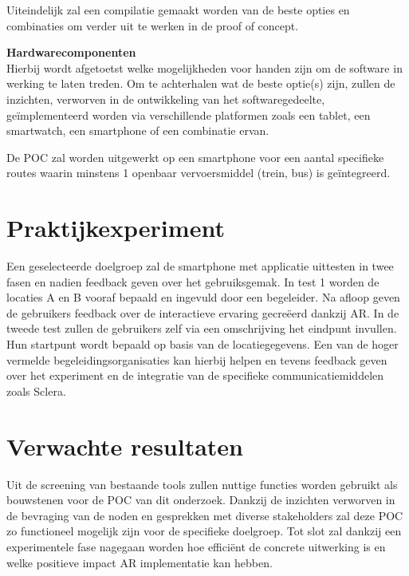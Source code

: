 \documentclass{hogent-article}
\begin{document}
    Uiteindelijk zal een compilatie gemaakt worden van de beste opties en combinaties om verder uit te werken in de proof of concept.
    
    \textbf{Hardwarecomponenten} \\
    
    Hierbij wordt afgetoetst welke mogelijkheden voor handen zijn om de software in werking te laten treden. Om te achterhalen wat de beste optie(s) zijn, zullen de inzichten, verworven in de ontwikkeling van het softwaregedeelte, geïmplementeerd worden via verschillende platformen zoals een tablet, een smartwatch, een smartphone of een combinatie ervan.
    
    De POC zal worden uitgewerkt op een smartphone voor een aantal specifieke routes waarin minstens 1 openbaar vervoersmiddel (trein, bus) is geïntegreerd.
    
    \section{Praktijkexperiment}
    \label{sec:praktijkexperiment}
    Een geselecteerde doelgroep zal de smartphone met applicatie uittesten in twee fasen en nadien feedback geven over het gebruiksgemak. In test 1 worden de locaties A en B vooraf bepaald en ingevuld door een begeleider. Na afloop geven de gebruikers feedback over de interactieve ervaring gecreëerd dankzij AR. In de tweede test zullen de gebruikers zelf via een omschrijving het eindpunt invullen. Hun startpunt wordt bepaald op basis van de locatiegegevens. Een van de hoger vermelde begeleidingsorganisaties kan hierbij helpen en tevens feedback geven over het experiment en de integratie van de specifieke communicatiemiddelen zoals Sclera.



    \section{Verwachte resultaten}%
    \label{sec:verwachte-resultaten}
    
    Uit de screening van bestaande tools zullen nuttige functies worden gebruikt als bouwstenen voor de POC van dit onderzoek. Dankzij de inzichten verworven in de bevraging van de noden en gesprekken met diverse stakeholders zal deze POC zo functioneel mogelijk zijn voor de specifieke doelgroep. Tot slot zal dankzij een experimentele fase nagegaan worden hoe efficiënt de concrete uitwerking is en welke positieve impact AR implementatie kan hebben.
    
\end{document}
